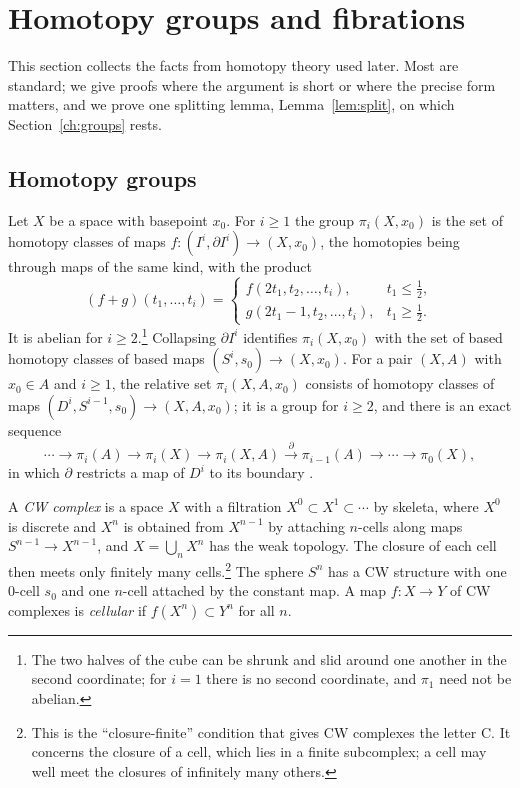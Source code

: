 \section{Homotopy groups and fibrations}\label{ch:foundations}

This section collects the facts from homotopy theory used later. Most are standard; we give proofs where the argument is short or where the precise form matters, and we prove one splitting lemma, Lemma~\ref{lem:split}, on which Section~\ref{ch:groups} rests.

\subsection{Homotopy groups}

Let $X$ be a space with basepoint $x_0$. For $i\ge1$ the group $\pi_i(X,x_0)$ is the set of homotopy classes of maps $f\colon(I^i,\partial I^i)\to(X,x_0)$, the homotopies being through maps of the same kind, with the product
\[
(f+g)(t_1,\dots,t_i)=\begin{cases}f(2t_1,t_2,\dots,t_i),&t_1\le\tfrac12,\\ g(2t_1-1,t_2,\dots,t_i),&t_1\ge\tfrac12.\end{cases}
\]
It is abelian for $i\ge2$.\footnote{The two halves of the cube can be shrunk and slid around one another in the second coordinate; for $i=1$ there is no second coordinate, and $\pi_1$ need not be abelian.} Collapsing $\partial I^i$ identifies $\pi_i(X,x_0)$ with the set of based homotopy classes of based maps $(S^i,s_0)\to(X,x_0)$. For a pair $(X,A)$ with $x_0\in A$ and $i\ge1$, the relative set $\pi_i(X,A,x_0)$ consists of homotopy classes of maps $(D^i,S^{i-1},s_0)\to(X,A,x_0)$; it is a group for $i\ge2$, and there is an exact sequence
\begin{equation}\label{eq:pair-les}
\cdots\to\pi_i(A)\to\pi_i(X)\to\pi_i(X,A)\xrightarrow{\ \partial\ }\pi_{i-1}(A)\to\cdots\to\pi_0(X),
\end{equation}
in which $\partial$ restricts a map of $D^i$ to its boundary \cite[Theorem~4.3]{Hat02}.

A \emph{CW complex} is a space $X$ with a filtration $X^0\subset X^1\subset\cdots$ by skeleta, where $X^0$ is discrete and $X^n$ is obtained from $X^{n-1}$ by attaching $n$-cells along maps $S^{n-1}\to X^{n-1}$, and $X=\bigcup_nX^n$ has the weak topology. The closure of each cell then meets only finitely many cells.\footnote{This is the ``closure-finite'' condition that gives CW complexes the letter C. It concerns the closure of a cell, which lies in a finite subcomplex; a cell may well meet the closures of infinitely many others.} The sphere $S^n$ has a CW structure with one $0$-cell $s_0$ and one $n$-cell attached by the constant map. A map $f\colon X\to Y$ of CW complexes is \emph{cellular} if $f(X^n)\subset Y^n$ for all $n$.


